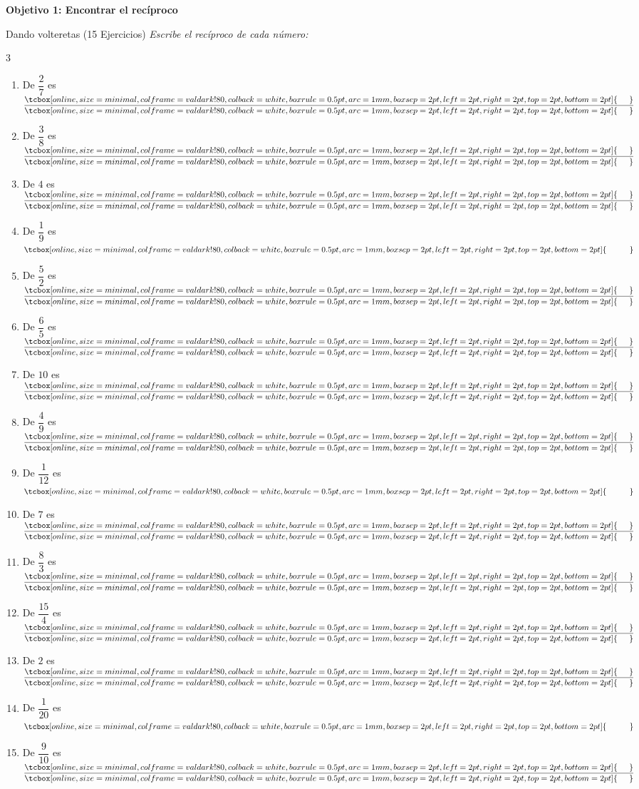 \documentclass[12pt, letterpaper]{article}
\newenvironment{objetivo}[1]{%
    \begin{tcolorbox}[colback=valblue!10, colframe=valblue, arc=2mm, boxrule=1.5pt]
        {\large\bfseries \ding{118} #1}
    \end{tcolorbox}
}{}
\newcommand{\boxfill}[1][0.8cm]{\tcbox[on line, size=minimal, colframe=valdark!80, colback=white, boxrule=0.5pt, arc=1mm, boxsep=2pt, left=2pt, right=2pt, top=2pt, bottom=2pt]{\makebox[#1]{\vphantom{M}}}}
\begin{document}
\begin{objetivo}{Objetivo 1: Encontrar el recíproco}
    \begin{practica}{Dando volteretas (15 Ejercicios)}
        \textit{Escribe el recíproco de cada número:}
        \vspace{0.2cm}
        \begin{multicols}{3}
            \raggedcolumns
            \begin{enumerate}[itemsep=0.4cm]
                \item De $\dfrac{2}{7}$ es $\dfrac{\boxfill[0.5cm]}{\boxfill[0.5cm]}$
                \item De $\dfrac{3}{8}$ es $\dfrac{\boxfill[0.5cm]}{\boxfill[0.5cm]}$
                \item De $4$ es $\dfrac{\boxfill[0.5cm]}{\boxfill[0.5cm]}$
                \item De $\dfrac{1}{9}$ es $\boxfill[1cm]$
                \item De $\dfrac{5}{2}$ es $\dfrac{\boxfill[0.5cm]}{\boxfill[0.5cm]}$
                \item De $\dfrac{6}{5}$ es $\dfrac{\boxfill[0.5cm]}{\boxfill[0.5cm]}$
                \item De $10$ es $\dfrac{\boxfill[0.5cm]}{\boxfill[0.5cm]}$
                \item De $\dfrac{4}{9}$ es $\dfrac{\boxfill[0.5cm]}{\boxfill[0.5cm]}$
                \item De $\dfrac{1}{12}$ es $\boxfill[1cm]$
                \item De $7$ es $\dfrac{\boxfill[0.5cm]}{\boxfill[0.5cm]}$
                \item De $\dfrac{8}{3}$ es $\dfrac{\boxfill[0.5cm]}{\boxfill[0.5cm]}$
                \item De $\dfrac{15}{4}$ es $\dfrac{\boxfill[0.5cm]}{\boxfill[0.5cm]}$
                \item De $2$ es $\dfrac{\boxfill[0.5cm]}{\boxfill[0.5cm]}$
                \item De $\dfrac{1}{20}$ es $\boxfill[1cm]$
                \item De $\dfrac{9}{10}$ es $\dfrac{\boxfill[0.5cm]}{\boxfill[0.5cm]}$
            \end{enumerate}
        \end{multicols}
    \end{practica}
\end{objetivo}

\vspace{0.4cm}
\end{document}
